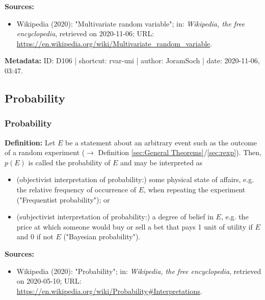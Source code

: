 \documentclass[a4paper,12pt,twoside]{book}
\begin{document}
\vspace{1em}
\textbf{Sources:}
\begin{itemize}
\item Wikipedia (2020): "Multivariate random variable"; in: \textit{Wikipedia, the free encyclopedia}, retrieved on 2020-11-06; URL: \url{https://en.wikipedia.org/wiki/Multivariate_random_variable}.
\end{itemize}


\vspace{1em}
\textbf{Metadata:} ID: D106 | shortcut: rvar-uni | author: JoramSoch | date: 2020-11-06, 03:47.
\vspace{1em}



\subsection{Probability}

\subsubsection[\textit{Probability}]{Probability} \label{sec:prob}
\setcounter{equation}{0}

\textbf{Definition:} Let $E$ be a statement about an arbitrary event such as the outcome of a random experiment ($\rightarrow$ Definition \ref{sec:General Theorems}/\ref{sec:rexp}). Then, $p(E)$ is called the probability of $E$ and may be interpreted as

\begin{itemize}

\item (objectivist interpretation of probability:) some physical state of affairs, e.g. the relative frequency of occurrence of $E$, when repeating the experiment ("Frequentist probability"); or

\item (subjectivist interpretation of probability:) a degree of belief in $E$, e.g. the price at which someone would buy or sell a bet that pays 1 unit of utility if $E$ and 0 if not $E$ ("Bayesian probability").

\end{itemize}


\vspace{1em}
\textbf{Sources:}
\begin{itemize}
\item Wikipedia (2020): "Probability"; in: \textit{Wikipedia, the free encyclopedia}, retrieved on 2020-05-10; URL: \url{https://en.wikipedia.org/wiki/Probability#Interpretations}.
\end{itemize}
\end{document}
